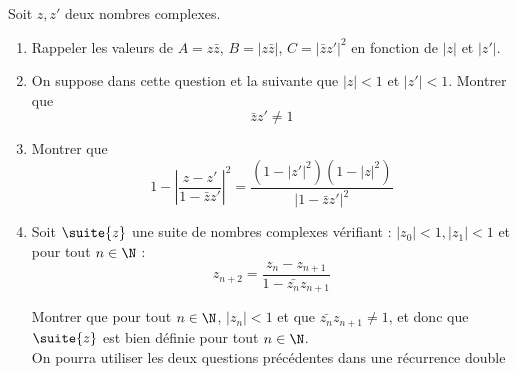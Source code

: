 



\begin{exercice}
Soit $z,z'$ deux nombres complexes.

\begin{enumerate}
\item Rappeler les valeurs de $A=z\bar{z}$, $B=|z\bar{z}|$, $C=|\bar{z}z'|^2$ en fonction de $|z|$ et $|z'|$. 
\item On suppose dans cette question et  la suivante que $|z|<1 $ et $|z' |<1$. Montrer que $$\bar{z}z'\neq 1$$

\item  Montrer que 
$$1- \left| \frac{z-z'}{1-\bar{z} z' } \right|^2 = \frac{(1-|z'|^2)(1-|z|^2)}{|1-\bar{z}z'|^2}$$
\item Soit $\suite{z}$ une suite de nombres complexes vérifiant : $|z_0|<1, |z_1|<1$  et pour tout $n\in \N$ :
$$z_{n+2} =\frac{z_n-z_{n+1}}{1-\bar{z_{n}} z_{n+1}}$$

Montrer que pour tout $n\in \N$, $|z_n|<1$ et que $\bar{z_n}z_{n+1}\neq 1$, et donc que $\suite{z}$ est bien définie pour tout $n\in \N$. \\
\footnotesize{On pourra utiliser les deux questions précédentes dans une récurrence double}

\end{enumerate}
\end{exercice}

